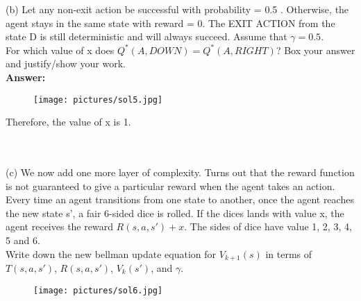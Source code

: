 \documentclass{article}
\begin{document}
\noindent (b) Let any non-exit action be successful with probability = 0.5 . Otherwise, the agent stays in the same state with reward = 0. The EXIT ACTION from the state D is still deterministic and will always succeed. Assume that $\gamma = 0.5$. \\


\noindent For which value of x does $Q^*(A,DOWN) = Q^*(A,RIGHT)$? Box your answer and justify/show your work.\\

\textbf{Answer:} 

\begin{figure}[h]
\centering
\texttt{[image: pictures/sol5.jpg]}
\end{figure}

\newpage

Therefore, the value of x is 1.

~\\
~\\

\noindent (c) We now add one more layer of complexity. Turns out that the reward function is not guaranteed to give a particular reward when the agent takes an action. Every time an agent transitions from one state to another, once the agent reaches the new state s', a fair 6-sided dice is rolled. If the dices lands with value x, the agent receives the reward $R(s, a, s') + x$. The sides of dice have value 1, 2, 3, 4, 5 and 6. \\

\noindent Write down the new bellman update equation for $V_{k+1}(s)$ in terms of $T(s,a,s')$, $R(s,a,s')$, $V_k(s')$, and $\gamma$.

\begin{figure}[h]
\centering
\texttt{[image: pictures/sol6.jpg]}
\end{figure}
\end{document}
